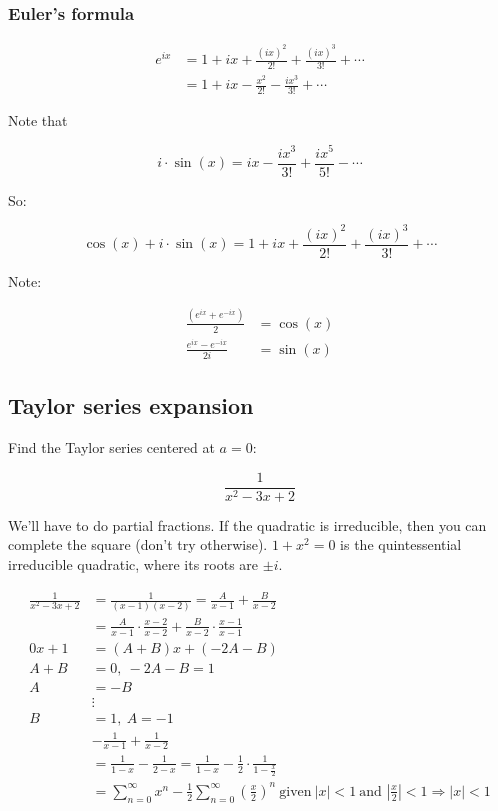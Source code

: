 \documentclass[12pt]{article}
\theoremstyle{plain}
\theoremstyle{remark}
\theoremstyle{definition}
\begin{document}
\subsubsection{Euler's formula}

\begin{align*}
e^{ix} &= 1 + ix + \frac{\left( ix \right)^{2}}{2!} + \frac{\left( ix \right)^{3}}{3!} + \cdots \\
&= 1 + ix - \frac{x^{2}}{2!} - \frac{ix^{3}}{3!} + \cdots
\end{align*}


Note that

\[i \cdot \sin(x) = ix - \frac{ix^{3}}{3!} + \frac{ix^{5}}{5!} - \cdots\]

So:

\[\cos(x) + i \cdot \sin(x) = 1 + ix + \frac{\left( ix \right)^{2}}{2!} + \frac{\left( ix \right)^{3}}{3!} + \cdots\]

Note:

\begin{align*}
\frac{\left( e^{ix} + e^{- ix} \right)}{2} &= \cos(x) \\
\frac{e^{ix} - e^{- ix}}{2i} &= \sin(x)
\end{align*}



\subsection{Taylor series expansion}

Find the Taylor series centered at \(a = 0\):

\[\frac{1}{x^{2} - 3x + 2}\]

We'll have to do partial fractions. If the quadratic is irreducible,
then you can complete the square (don't try otherwise).
\(1 + x^{2} = 0\) is the quintessential irreducible quadratic, where its
roots are \(\pm i\).

\begin{align*}
\frac{1}{x^{2} - 3x + 2} &= \frac{1}{(x - 1)(x - 2)} = \frac{A}{x - 1} + \frac{B}{x - 2} \\
&= \frac{A}{x - 1} \cdot \frac{x - 2}{x - 2} + \frac{B}{x - 2} \cdot \frac{x - 1}{x - 1} \\
0x + 1 &= (A + B)x + ( - 2A - B) \\
A + B &= 0,\  - 2A - B = 1 \\
A &= - B \\
&\vdots  \\
B &= 1,\ A = - 1 \\
&- \frac{1}{x - 1} + \frac{1}{x - 2} \\
&= \frac{1}{1 - x} - \frac{1}{2 - x} = \frac{1}{1 - x} - \frac{1}{2} \cdot \frac{1}{1 - \frac{x}{2}} \\
&= \sum_{n = 0}^{\infty}x^{n} - \frac{1}{2}\sum_{n = 0}^{\infty}\left( \frac{x}{2} \right)^{n}\ \text{given}\ |x| < 1\ \text{and\ }\left| \frac{x}{2} \right| < 1 \Rightarrow |x| < 1
\end{align*}
\end{document}
